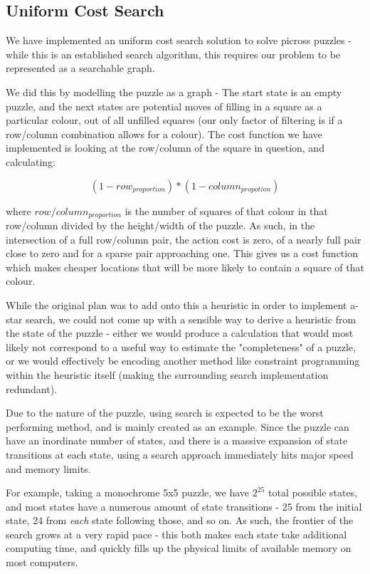 \documentclass{svproc}
\begin{document}
\subsection{Uniform Cost Search}
We have implemented an uniform cost search solution to solve picross puzzles - while this is an established search algorithm, this requires our problem to be represented as a searchable graph.

We did this by modelling the puzzle as a graph - The start state is an empty puzzle, and the next states are potential moves of filling in a square as a particular colour, out of all unfilled squares (our only factor of filtering is if a row/column combination allows for a colour). The cost function we have implemented is looking at the row/column of the square in question, and calculating:

$$ (1 - row_{proportion}) * (1 - column_{propotion}) $$

where $row/column_{proportion}$ is the number of squares of that colour in that row/column divided by the height/width of the puzzle. As such, in the intersection of a full row/column pair, the action cost is zero, of a nearly full pair close to zero and for a sparse pair approaching one. This gives us a cost function which makes cheaper locations that will be more likely to contain a square of that colour.

While the original plan was to add onto this a heuristic in order to implement a-star search, we could not come up with a sensible way to derive a heuristic from the state of the puzzle - either we would produce a calculation that would most likely not correspond to a useful way to estimate the "completeness" of a puzzle, or we would effectively be encoding another method like constraint programming within the heuristic itself (making the surrounding search implementation redundant).

Due to the nature of the puzzle, using search is expected to be the worst performing method, and is mainly created as an example. Since the puzzle can have an inordinate number of states, and there is a massive expansion of state transitions at each state, using a search approach immediately hits major speed and memory limits.

For example, taking a monochrome 5x5 puzzle, we have $2^{25}$ total possible states, and most states have a numerous amount of state transitions - 25 from the initial state, 24 from \textit{each} state following those, and so on. As such, the frontier of the search grows at a very rapid pace - this both makes each state take additional computing time, and quickly fills up the physical limits of available memory on most computers.
\end{document}
